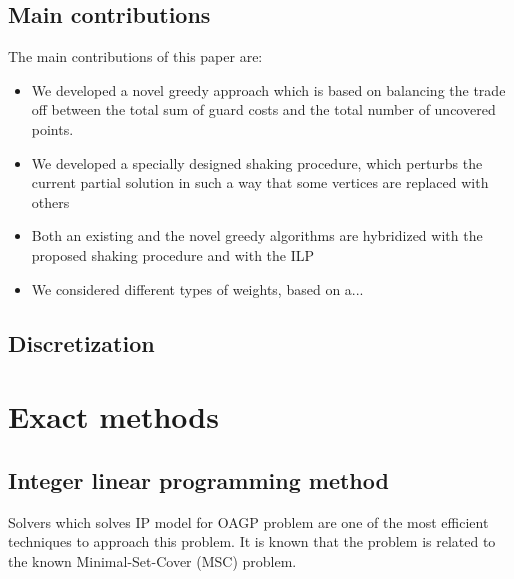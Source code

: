 \documentclass[runningheads,a4paper]{elsarticle}
\begin{document}
\subsection{Main contributions}
The main contributions of this paper are:
\begin{itemize}
\item We developed a novel greedy approach which is based on balancing the trade off between the total sum of guard costs and the total number of uncovered points.
\item We developed a specially designed shaking procedure, which perturbs the current partial solution in such a way that some vertices are replaced with others 
\item Both an existing and the novel greedy algorithms are hybridized with the proposed shaking procedure and with the ILP
\item We considered different types of weights, based on a... 
\end{itemize}

     
     \subsection{Discretization}  
     
     \section{Exact methods}
     \subsection{Integer linear programming method}
     Solvers which solves IP model for OAGP problem are one of the most efficient techniques to approach this problem. It is known that the problem is related to the known Minimal-Set-Cover (MSC) problem.
\end{document}
